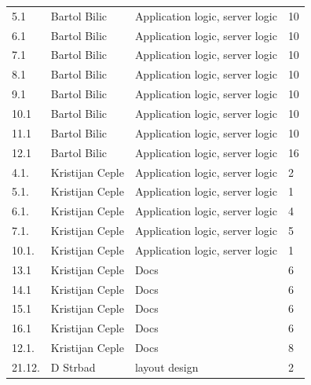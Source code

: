 \begin{longtable}{llll}
			5.1              & Bartol Bilic                  & Application logic, server logic & 10        \\
			6.1              & Bartol Bilic                  & Application logic, server logic & 10        \\
			7.1              & Bartol Bilic                  & Application logic, server logic & 10        \\
			8.1              & Bartol Bilic                  & Application logic, server logic & 10        \\
			9.1              & Bartol Bilic                  & Application logic, server logic & 10        \\
			10.1             & Bartol Bilic                  & Application logic, server logic & 10        \\
			11.1             & Bartol Bilic                  & Application logic, server logic & 10        \\
			12.1             & Bartol Bilic                  & Application logic, server logic & 16        \\
			4.1.             & Kristijan Ceple               & Application logic, server logic & 2         \\
			5.1.             & Kristijan Ceple               & Application logic, server logic & 1         \\
			6.1.             & Kristijan Ceple               & Application logic, server logic & 4         \\
			7.1.             & Kristijan Ceple               & Application logic, server logic & 5         \\
			10.1.            & Kristijan Ceple               & Application logic, server logic & 1         \\
			13.1             & Kristijan Ceple               & Docs                           & 6         \\
			14.1             & Kristijan Ceple               & Docs                            & 6         \\
			15.1             & Kristijan Ceple               & Docs                            & 6         \\
			16.1             & Kristijan Ceple               & Docs                            & 6         \\
			12.1.            & Kristijan Ceple               & Docs                            & 8         \\
			21.12.           & D Strbad                      & layout design                   & 2         \\

\end{longtable}
